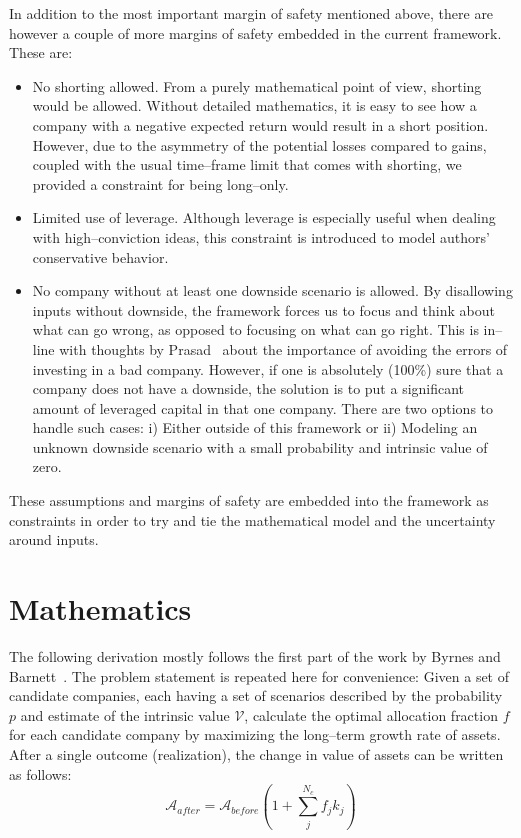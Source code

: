 \documentclass{article}
\begin{document}
In addition to the most important margin of safety mentioned above, there are
however a couple of more margins of safety embedded in the current framework.
These are:
\begin{itemize}
    \item No shorting allowed. From a purely mathematical point of view,
    shorting would be allowed. Without detailed mathematics, it is easy to see
    how a company with a negative expected return would result in a short
    position. However, due to the asymmetry of the potential losses compared to
    gains, coupled with the usual time--frame limit that comes with shorting, we
    provided a constraint for being long--only.
    \item Limited use of leverage. Although leverage is especially useful when
    dealing with high--conviction ideas, this constraint is introduced to model
    authors' conservative behavior.
    \item No company without at least one downside scenario is allowed. By
    disallowing inputs without downside, the framework forces us to focus and
    think about what can go wrong, as opposed to focusing on what can go
    right. This is in--line with thoughts by Prasad~\cite{darwinInvesting} about
    the importance of avoiding the errors of investing in a bad company.
    However, if one is absolutely (100\%) sure that a company does not have a
    downside, the solution is to put a significant amount of leveraged capital
    in that one company. There are two options to handle such cases: i) Either
    outside of this framework or ii) Modeling an unknown downside scenario with
    a small probability and intrinsic value of zero.
\end{itemize}

These assumptions and margins of safety are embedded into the framework as
constraints in order to try and tie the mathematical model and the uncertainty
around inputs.

\section{Mathematics}
\label{sec:mathematics}

The following derivation mostly follows the first part of the work by Byrnes and
Barnett~\cite{byrnesBarnett}. The problem statement is repeated here for
convenience: Given a set of candidate companies, each having a set of scenarios
described by the probability $p$ and estimate of the intrinsic value
$\mathcal{V}$, calculate the optimal allocation fraction $f$ for each candidate
company by maximizing the long--term growth rate of assets. After a single
outcome (realization), the change in value of assets can be written as follows:
\begin{equation}
\label{eq:1}
    \mathcal{A}_{after}
  = 
    \mathcal{A}_{before}
    \left( 1 + \sum_{j}^{N_c} f_j k_j \right)
\end{equation} 
\end{document}
